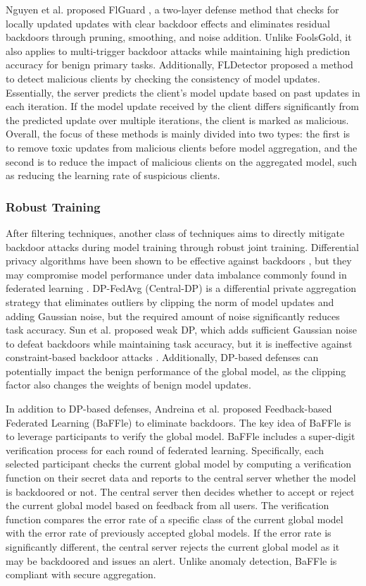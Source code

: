 \documentclass[conference]{IEEEtran}
\begin{document}
Nguyen et al. proposed FlGuard \cite{b80}, a two-layer defense method that checks
for locally updated updates with clear backdoor effects and eliminates residual backdoors through pruning, smoothing, and noise
addition. Unlike FoolsGold\cite{b78}, it also applies to multi-trigger backdoor attacks while maintaining high prediction accuracy for benign primary tasks.
Additionally, FLDetector \cite{b81} proposed a method to detect malicious clients by checking the consistency of model updates. Essentially,
the server predicts the client's model update based on past updates in each iteration. If the model update received by the client
differs significantly from the predicted update over multiple iterations, the client is marked as malicious. Overall, the focus of
these methods is mainly divided into two types: the first is to remove toxic updates from malicious clients before model aggregation,
and the second is to reduce the impact of malicious clients on the aggregated model, such as reducing the learning rate of suspicious clients.

\subsubsection{Robust Training}
After filtering techniques, another class of techniques aims to directly mitigate backdoor attacks during model training through robust joint training.
Differential privacy algorithms have been shown to be effective against backdoors \cite{b82}, but they may compromise model performance under data imbalance
commonly found in federated learning \cite{b83}. DP-FedAvg \cite{b84} (Central-DP) is a differential private aggregation strategy that eliminates
outliers by clipping the norm of model updates and adding Gaussian noise, but the required amount of noise significantly reduces
task accuracy. Sun et al. \cite{b27} proposed weak DP, which adds sufficient Gaussian noise to defeat backdoors while maintaining task accuracy,
but it is ineffective against constraint-based backdoor attacks \cite{b25}.
Additionally, DP-based defenses can potentially impact the benign performance of the global model,
as the clipping factor also changes the weights of benign model updates.

In addition to DP-based defenses, Andreina et al. \cite{b85}proposed Feedback-based Federated Learning (BaFFle) to eliminate backdoors.
The key idea of BaFFle is to leverage participants to verify the global model. BaFFle includes a super-digit verification process for each
round of federated learning. Specifically, each selected participant checks the current global model by computing a verification function on
their secret data and reports to the central server whether the model is backdoored or not. The central server then decides whether
to accept or reject the current global model based on feedback from all users. The verification function compares the error rate of
a specific class of the current global model with the error rate of previously accepted global models. If the error rate is significantly different,
the central server rejects the current global model as it may be backdoored and issues an alert. Unlike anomaly detection, BaFFle is compliant with secure aggregation.
\end{document}
